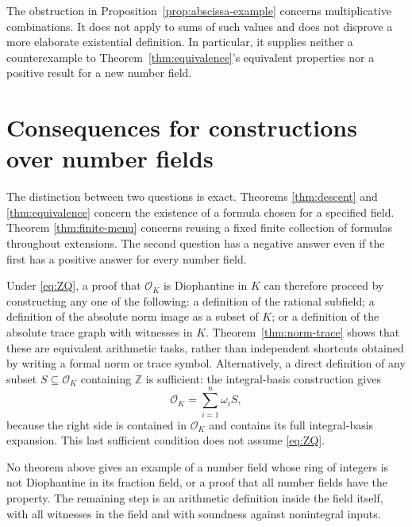 \documentclass[11pt,a4paper]{article}
\theoremstyle{definition}
\newcommand{\Z}{\mathbb Z}
\newcommand{\OK}{\mathcal O_K}
\begin{document}
The obstruction in Proposition~\ref{prop:abscissa-example}
concerns multiplicative combinations. It does not apply to
sums of such values and does not disprove a more elaborate
existential definition. In particular, it supplies neither a
counterexample to Theorem~\ref{thm:equivalence}'s equivalent
properties nor a positive result for a new number field.

\section{Consequences for constructions over number fields}

The distinction between two questions is exact. Theorems
\ref{thm:descent} and \ref{thm:equivalence} concern the existence
of a formula chosen for a specified field. Theorem
\ref{thm:finite-menu} concerns reusing a fixed finite collection
of formulas throughout extensions. The second question has a
negative answer even if the first has a positive answer for
every number field.

Under \eqref{eq:ZQ}, a proof that $\OK$ is Diophantine in $K$
can therefore proceed by constructing any one of the following:
a definition of the rational subfield; a definition of the
absolute norm image as a subset of $K$; or a definition of the
absolute trace graph with witnesses in $K$.
Theorem~\ref{thm:norm-trace} shows that these are equivalent
arithmetic tasks, rather than independent shortcuts obtained
by writing a formal norm or trace symbol.
Alternatively, a direct definition of any subset $S\subseteq\OK$
containing $\Z$ is sufficient: the integral-basis construction
gives
\[
                    \OK=\sum_{i=1}^n\omega_i S,
\]
because the right side is contained in $\OK$ and contains its
full integral-basis expansion. This last sufficient condition
does not assume \eqref{eq:ZQ}.

No theorem above gives an example of a number field whose ring
of integers is not Diophantine in its fraction field, or a proof
that all number fields have the property. The remaining step is
an arithmetic definition inside the field itself, with all
witnesses in the field and with soundness against nonintegral
inputs.
\end{document}
